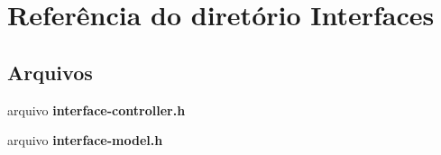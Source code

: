 \section{Referência do diretório Interfaces}
\label{dir_552e72e3bcc035e9d02541fe1581b405}
\subsection*{Arquivos}
\begin{DoxyCompactItemize}
\item 
arquivo {\bf interface-\/controller.\+h}
\item 
arquivo {\bf interface-\/model.\+h}
\end{DoxyCompactItemize}
